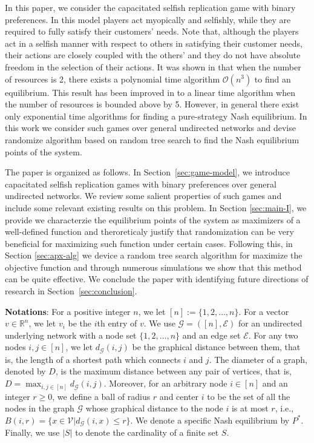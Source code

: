 \documentclass[conference, 10pt, twocolumn]{ieeeconf}
\newcounter{note}
\def\R{\mathbb{R}}
\begin{document}
In this paper, we consider the capacitated selfish replication game with binary preferences. In this model players act myopically and selfishly, while they are required to fully satisfy their customers' needs. Note that, although the players act in a selfish manner with respect to others in satisfying their customer needs, their actions are closely coupled with the others' and they do not have absolute freedom in the selection of their actions. It was shown in \cite{gopalakrishnan2012cache} that when the number of resources is 2, there exists a polynomial time algorithm $\mathcal{O}(n^3)$ to find an equilibrium. This result has been improved in \cite{etesami2014pure} to a linear time algorithm when the number of resources is bounded above by 5. However, in general there exist only exponential time algorithms for finding a pure-strategy Nash equilibrium. In this work we consider such games over general undirected networks and devise randomize algorithm based on random tree search to find the Nash equilibrium points of the system.
 
The paper is organized as follows. In Section~\ref{sec:game-model}, we introduce capacitated selfish replication games with binary preferences over general undirected networks. We review some salient properties of such games and include some relevant existing results on this problem. In Section \ref{sec:main-I}, we provide we characterzie the equilibrium points of the system as maximizers of a well-defined function and theroreticaly justify that randomization can be very beneficial for maximizing such function under certain cases. Following this, in Section \ref{sec:apx-alg} we device a random tree search algorithm for maximize the objective function and through numerous simulations we show that this method can be quite effective. We conclude the paper with identifying future directions of research in Section~\ref{sec:conclusion}. 

\textbf{Notations}: 
For a positive integer $n$, we let $[n]:=\{1,2,\ldots,n\}$. For a vector $v\in \R^n$, we let $v_i$ be the $i$th entry of $v$. We use $\mathcal{G}=([n], \mathcal{E})$ for an undirected underlying network with a node set $\{1,2,\ldots,n\}$ and an edge set $\mathcal{E}$. For any two nodes $i, j \in [n]$, we let $d_{\mathcal{G}}(i,j)$ be the graphical distance between them, that is, the length of a shortest path which connects $i$ and $j$. The diameter of a graph, denoted by $D$, is the maximum distance between any pair of vertices, that is, $D=\max_{i,j \in [n]} d_{\mathcal{G}}(i,j)$. Moreover, for an arbitrary node $i\in [n]$ and an integer $r\ge 0$, we define a ball of radius $r$ and center $i$ to be the set of all the nodes in the graph $\mathcal{G}$ whose graphical distance to the node $i$ is at most $r$, i.e., $B(i,r)=\{x\in \mathcal{V}| d_{\mathcal{G}}(i,x)\leq r\}$. We denote a specific Nash equilibrium by $P^*$. Finally, we use $|S|$ to denote the cardinality of a finite set $S$.
 
\end{document}
